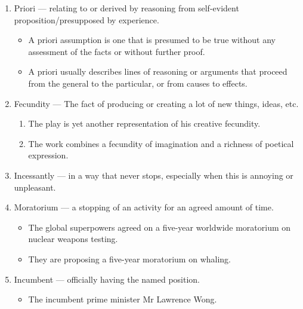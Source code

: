 \documentclass[oneside]{book}
\begin{document}
\begin{enumerate}
\begin{enumerate}
    \end{enumerate}
    \normalsize
    \item Priori --- relating to or derived by reasoning from self-evident proposition/presupposed by experience.
    \footnotesize
    \begin{itemize}
        \item A priori assumption is one that is presumed to be true without any assessment of the facts or without further proof.
        \item A priori usually describes lines of reasoning or arguments that proceed from the general to the particular, or from causes to effects.
    \end{itemize}
    \normalsize
    \item Fecundity --- The fact of producing or creating a lot of new things, ideas, etc. 
    \footnotesize
    \begin{enumerate}
        \item The play is yet another representation of his creative fecundity.
        \item The work combines a fecundity of imagination and a richness of poetical expression.
    \end{enumerate}
    \normalsize
    \item Incessantly --- in a way that never stops, especially when this is annoying or unpleasant.
    \item Moratorium --- a stopping of an activity for an agreed amount of time. 
    \begin{footnotesize}
        \begin{itemize}
            \item The global superpowers agreed on a five-year worldwide moratorium on nuclear weapons testing.
            \item They are proposing a five-year moratorium on whaling.
        \end{itemize}
    \end{footnotesize}
    \item Incumbent --- officially having the named position.
    \begin{itemize}
        \item The incumbent prime minister Mr Lawrence Wong.
    \end{itemize}
\end{enumerate}
\end{document}
